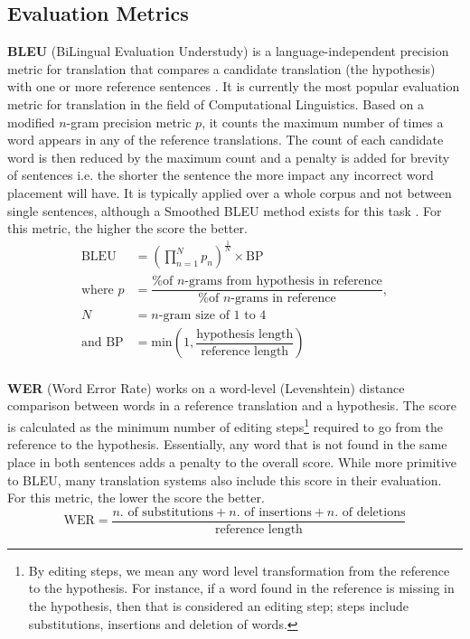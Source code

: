 \documentclass[12pt]{ociamthesis}  %
\begin{document}
\subsection{Evaluation Metrics}
\textbf{BLEU} (BiLingual Evaluation Understudy) is a language-independent precision metric for translation that compares a candidate translation (the hypothesis) with one or more reference sentences . It is currently the most popular evaluation metric for translation in the field of Computational Linguistics. Based on a modified $n$-gram precision metric $p$, it counts the maximum number of times a word appears in any of the reference translations. The count of each candidate word is then reduced by the maximum count and a penalty is added for brevity of sentences i.e. the shorter the sentence the more impact any incorrect word placement will have. It is typically applied over a whole corpus and not between single sentences, although a Smoothed BLEU method exists for this task . For this metric, the higher the score the better.
\begin{align*}
\text{BLEU} &= \left( \displaystyle\prod_{n=1}^{N} p_n \right) ^{\frac{1}{N}} \times \text{BP} \\[2ex]
\text{where } p &= \dfrac{\text{\% of }n\text{-grams from hypothesis in reference}}{\text{\% of }n\text{-grams in reference}}, \\[2ex]
N &= n\text{-gram size of 1 to 4}\\[2ex]
\text{and BP} &= \text{min}\left( 1, \dfrac{\text{hypothesis length}}{\text{reference length}} \right ) 
\end{align*}
\\

\noindent \textbf{WER} (Word Error Rate) works on a word-level (Levenshtein) distance comparison between words in a reference translation and a hypothesis. The score is calculated as the minimum number of editing steps\footnote{By editing steps, we mean any word level transformation from the reference to the hypothesis. For instance, if a word found in the reference is missing in the hypothesis, then that is considered an editing step; steps include substitutions, insertions and deletion of words.} required to go from the reference to the hypothesis. Essentially, any word that is not found in the same place in both sentences adds a penalty to the overall score. While more primitive to BLEU, many translation systems also include this score in their evaluation. For this metric, the lower the score the better.
\[
	\text{WER} = \dfrac{n\text{. of substitutions} + n\text{. of insertions} + n\text{. of deletions}}{\text{reference length}}
\]
\end{document}

